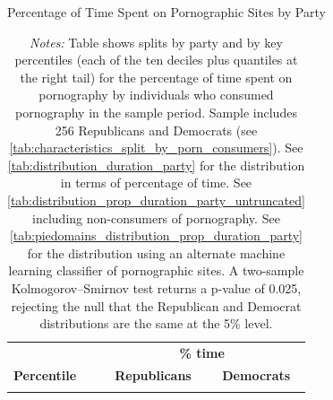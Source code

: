 \documentclass[12pt, letterpaper]{article}
\begin{document}
\begin{table}[ht] \centering \small \setlength\tabcolsep{10 pt}
	\caption{Percentage of Time Spent on Pornographic Sites by Party}
	\label{tab:distribution_prop_duration_party}
	\begin{adjustbox}{max width=\textwidth}
		\begin{tabular}{crr}
			\toprule
			\multicolumn{1}{l}{\textbf{}}&\multicolumn{2}{c}{\textbf{\% time}}\\
			\cmidrule(l){2-3}
			\multicolumn{1}{l}{\textbf{Percentile}}&\multicolumn{1}{c}{\textbf{Republicans}}&\multicolumn{1}{c}{\textbf{Democrats}}\\
			\midrule
			\\
			\bottomrule
		\end{tabular}
	\end{adjustbox}
	\caption*{\footnotesize \emph{Notes:} 
		Table shows splits by party and by key percentiles (each of the ten deciles plus quantiles at the right tail) for the percentage of time spent on pornography by individuals who consumed pornography in the sample period. 
		Sample includes 256 Republicans and Democrats (see \cref{tab:characteristics_split_by_porn_consumers}).
		See \cref{tab:distribution_duration_party} for the distribution in terms of percentage of time.
		See \cref{tab:distribution_prop_duration_party_untruncated} including non-consumers of pornography.
		See \cref{tab:piedomains_distribution_prop_duration_party} for the distribution using an alternate machine learning classifier of pornographic sites. 
		A two-sample Kolmogorov–Smirnov test returns a p-value of 0.025, rejecting the null that the Republican and Democrat distributions are the same at the 5\% level.
	}
\end{table}
\end{document}
